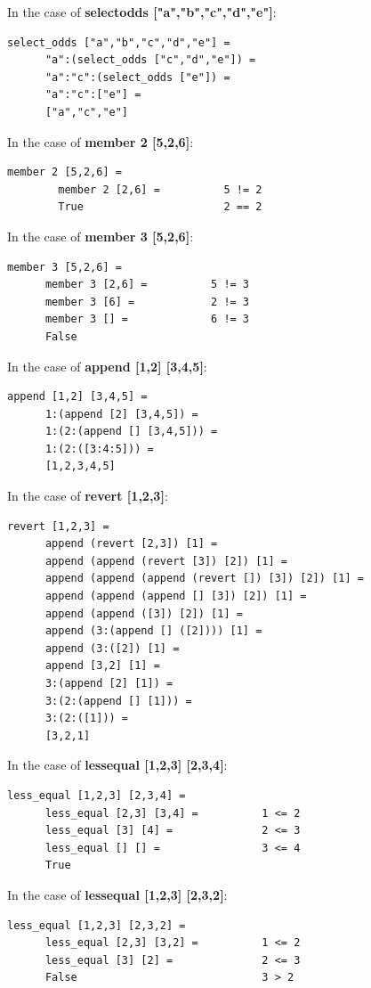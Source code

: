 \documentclass{article}
\theoremstyle{theorem}
\theoremstyle{definition}
\theoremstyle{remark}
\begin{document}
In the case of \textbf{select\textunderscore odds ["a","b","c","d","e"]}:
\begin{lstlisting}
select_odds ["a","b","c","d","e"] =
      "a":(select_odds ["c","d","e"]) =
      "a":"c":(select_odds ["e"]) =
      "a":"c":["e"] =
      ["a","c","e"]
\end{lstlisting}
In the case of \textbf{member 2 [5,2,6]}:
\begin{lstlisting}
member 2 [5,2,6] =
        member 2 [2,6] =          5 != 2
        True                      2 == 2
\end{lstlisting}
In the case of \textbf{member 3 [5,2,6]}:
\begin{lstlisting}
member 3 [5,2,6] =
      member 3 [2,6] =          5 != 3
      member 3 [6] =            2 != 3
      member 3 [] =             6 != 3
      False
\end{lstlisting}
In the case of \textbf{append [1,2] [3,4,5]}:
\begin{lstlisting}
append [1,2] [3,4,5] =
      1:(append [2] [3,4,5]) =
      1:(2:(append [] [3,4,5])) =
      1:(2:([3:4:5])) =
      [1,2,3,4,5]
\end{lstlisting}
In the case of \textbf{revert [1,2,3]}:
\begin{lstlisting}
revert [1,2,3] =
      append (revert [2,3]) [1] =
      append (append (revert [3]) [2]) [1] =
      append (append (append (revert []) [3]) [2]) [1] =
      append (append (append [] [3]) [2]) [1] =
      append (append ([3]) [2]) [1] =
      append (3:(append [] ([2]))) [1] =
      append (3:([2]) [1] =
      append [3,2] [1] =
      3:(append [2] [1]) =
      3:(2:(append [] [1])) =
      3:(2:([1])) =
      [3,2,1]
\end{lstlisting}
In the case of \textbf{less\textunderscore equal [1,2,3] [2,3,4]}:
\begin{lstlisting}
less_equal [1,2,3] [2,3,4] =
      less_equal [2,3] [3,4] =          1 <= 2
      less_equal [3] [4] =              2 <= 3
      less_equal [] [] =                3 <= 4
      True
\end{lstlisting}
In the case of \textbf{less\textunderscore equal [1,2,3] [2,3,2]}:
\begin{lstlisting}
less_equal [1,2,3] [2,3,2] =
      less_equal [2,3] [3,2] =          1 <= 2
      less_equal [3] [2] =              2 <= 3
      False                             3 > 2
\end{lstlisting}
\end{document}
